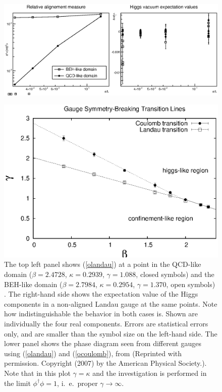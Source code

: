 \documentclass[final,12pt]{article}
\newcommand*{\pref}[1]{(\ref{#1})}
\newcommand*{\1}{1\!\!\!\bot}
\begin{document}
\begin{figure}[!htbp]
\includegraphics[width=\linewidth]{global}\\
\begin{minipage}{0.6\linewidth}
\includegraphics[width=\linewidth]{gc-pd}
\end{minipage}
\begin{minipage}{0.4\linewidth}
\caption{\label{fig:cg}The top left panel shows \pref{olandau} at a point in the QCD-like domain ($\beta=2.4728$, $\kappa=0.2939$, $\gamma=1.088$, closed symbols) and the BEH-like domain ($\beta=2.7984$, $\kappa=0.2954$, $\gamma=1.370$, open symbols) \cite{Maas:unpublished}. The right-hand side shows the expectation value of the Higgs components in a non-aligned Landau gauge \cite{Maas:2012ct,Maas:unpublished} at the same points. Note how indistinguishable the behavior in both cases is. Shown are individually the four real components. Errors are statistical errors only, and are smaller than the symbol size on the left-hand side. The lower panel shows the phase diagram seen from different gauges using \pref{olandau} and \pref{ocoulomb}, from \cite{Caudy:2007sf} (Reprinted with permission. Copyright (2007) by the American Physical Society.). Note that in this plot $\gamma=\kappa$ and the investigation is performed in the limit $\phi^\dagger\phi=1$, i.\ e.\ proper $\gamma\to\infty$.}
\end{minipage}
\end{figure}
\end{document}

